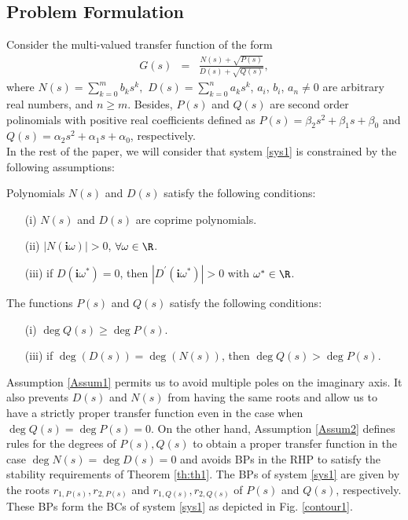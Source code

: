 \documentclass[twoside,reqno,11pt]{fcaa-var} %
\begin{document}
\subsection{Problem Formulation}
Consider the multi-valued transfer function of the form
\begin{eqnarray}
G(s)&=&\frac{N(s)+\sqrt{P(s)}}{D(s)+\sqrt{Q(s)}}, \label{sys1}
\end{eqnarray}
where $N(s)=\sum_{k=0}^{m}b_ks^k,$ $D(s)=\sum_{k=0}^{n}a_ks^k$, $a_i$, $b_i$, $a_n\neq0$ are arbitrary real numbers, and $n\geq m$. Besides, $P(s)$ and $Q(s)$ are second order polinomials with positive real coefficients defined as $P(s)=\beta_2s^2+\beta_1 s+\beta_0$ and $Q(s)=\alpha_2s^2+\alpha_1 s+\alpha_0$, respectively.\\
In the rest of the paper, we will consider that system \eqref{sys1} is constrained by the following assumptions:
\begin{assumption}\label{Assum1}
	Polynomials $N(s)$ and $D(s)$ satisfy the following conditions:
	\begin{itemize}
		\item [(i)] $N(s)$ and $D(s)$ are coprime polynomials.
		\item [(ii)] $|N(\bm{i}\omega)|>0$, $\forall\omega\in\R$.
		\item [(iii)] if $D(\bm{i}\omega^*)=0$, then $|D^\prime(\bm{i}\omega^*)|>0$ with $\omega^*\in\R$.
	\end{itemize}
\end{assumption}
\begin{assumption}\label{Assum2}
	The functions $P(s)$ and $Q(s)$ satisfy the following conditions:
	\begin{itemize}
		\item  [(i)] $\deg Q(s) \geq \deg P(s)$.
		\item [(iii)] if $\deg(D(s))=\deg(N(s))$, then $\deg Q(s) > \deg P(s)$.
	\end{itemize}
\end{assumption}
Assumption \ref{Assum1} permits us to avoid multiple poles on the imaginary axis. It also prevents $D(s)$ and $N(s)$ from having the same roots and allow us to have a strictly proper transfer function even in the case when $\deg Q(s)=\deg P(s)=0$. On the other hand, Assumption \ref{Assum2} defines rules for the degrees of $P(s),Q(s)$ to obtain a proper transfer function in the case  $\deg N(s)=\deg D(s)=0$ and avoids BPs in the RHP to satisfy the stability requirements of Theorem \ref{th:th1}. The BPs of system \eqref{sys1} are given by the roots $r_{1,P(s)},r_{2,P(s)}$ and $r_{1,Q(s)},r_{2,Q(s)}$ of $P(s)$ and $Q(s)$, respectively. These BPs form the BCs of system \eqref{sys1} as depicted in Fig. \ref{contour1}.\par
\end{document}
